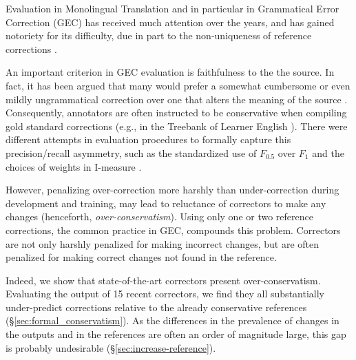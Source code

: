 \documentclass[letterpaper, 11pt]{article}
\begin{document}
Evaluation in Monolingual Translation \cite{xu2015problems,inderjeet2009summarization} and in particular in Grammatical Error Correction (GEC) \cite{tetreault2008native,madnani2011they,felice2015towards,bryant2015far,napoles2015ground} has received much attention over the 
years, and has gained notoriety for its difficulty, due in part to the non-uniqueness of reference corrections \cite{chodorow2012problems}.

An important criterion in GEC evaluation is faithfulness to the the source. 
In fact, it has been argued that many would prefer a somewhat cumbersome or even mildly ungrammatical 
correction over one that alters the meaning of the source \cite{brockett2006correcting}.
Consequently, annotators are often instructed to be conservative when compiling gold standard corrections (e.g., in the Treebank of Learner English \cite{nicholls2003cambridge}).
There were different attempts in evaluation procedures to formally capture this precision/recall asymmetry,
such as the standardized use of $F_{0.5}$ over $F_{1}$ \cite{ng2014conll} and the 
choices of weights in I-measure \cite{felice2015towards}.

However, penalizing over-correction more harshly than under-correction during development and training, 
may lead to reluctance of correctors to make any changes (henceforth, {\it over-conservatism}).
Using only one or two reference corrections, the common practice in GEC, compounds this problem. Correctors are not only harshly penalized for making incorrect changes, but are often penalized
for making correct changes not found in the reference.

Indeed, we show that state-of-the-art correctors present over-conservatism.
Evaluating the output of 15 recent correctors, we find they all
substantially under-predict corrections relative to the already conservative references
(\S\ref{sec:formal_conservatism}).
As the differences in the prevalence of changes in the outputs and in the references are
often an order of magnitude large, this gap is probably undesirable (\S\ref{sec:increase-reference}).
\end{document}
